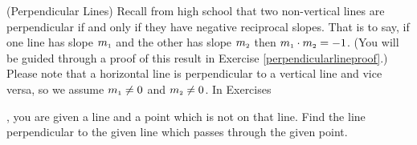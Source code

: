 {
\label{perpendicularlines}

\noindent (Perpendicular Lines)  Recall from high school that two non-vertical lines are perpendicular if and only if they have negative reciprocal slopes.  That is to say, if one line has slope $m_{\mbox{\tiny$1$}}$ and the other has slope $m_{\mbox{\tiny$2$}}$ then $m_{\mbox{\tiny$1$}} \cdot m_{\mbox{\tiny$2$}} = -1$.  (You will be guided through a proof of this result in Exercise \ref{perpendicularlineproof}.)  Please note that a horizontal line is perpendicular to a vertical line and vice versa, so we assume $m_{\mbox{\tiny$1$}} \neq 0$ and $m_{\mbox{\tiny$2$}} \neq 0$. In Exercises}
{, you are given a line and a point which is not on that line.  Find the line perpendicular to the given line which passes through the given point.
}
